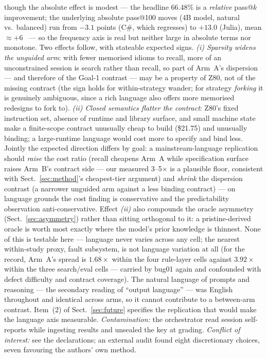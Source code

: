 \documentclass[runningheads]{llncs}
\begin{document}
though the absolute effect is modest --- the headline 66.48\% is a
\emph{relative} pass@$k$ improvement; the underlying absolute pass@100
moves (4B model, natural vs.\ balanced) run from $-3.1$ points (C\#, which
regresses) to $+13.0$ (Julia), mean $\approx{+}6$~\cite{orlanski2023} ---
so the frequency axis is real but neither large in absolute terms nor
monotone. Two effects follow, with stateable expected signs. \emph{(i) Sparsity widens the unguided arm}: with
fewer memorised idioms to recall, more of an unconstrained session is search
rather than recall, so part of Arm~A's dispersion --- and therefore of the
Goal-1 contrast --- may be a property of Z80, not of the missing contract
(the sign holds for within-strategy wander; for strategy \emph{forking} it
is genuinely ambiguous, since a rich language also offers more memorised
redesigns to fork to). \emph{(ii) Closed semantics flatter the contract}:
Z80's fixed instruction set, absence of runtime and library surface, and
small machine state make a finite-scope contract unusually cheap to build
(\$21.75) and unusually binding; a large-runtime language would cost more to
specify and bind less. Jointly the expected direction differs by goal: a
mainstream-language replication should \emph{raise} the cost ratio (recall
cheapens Arm~A while specification surface raises Arm~B's contract side ---
our measured 3--5$\times$ is a plausible floor, consistent with
Sect.~\ref{sec:method}'s cheapest-tier argument) and \emph{shrink} the
dispersion contrast (a narrower unguided arm against a less binding
contract) --- on language grounds the cost finding is conservative and the
predictability observation anti-conservative. Effect \emph{(ii)} also
compounds the oracle asymmetry (Sect.~\ref{sec:asymmetry}) rather than
sitting orthogonal to it: a pristine-derived oracle is worth most exactly
where the model's prior knowledge is thinnest. None of this is testable
here --- language never varies across any cell; the nearest within-study
proxy, fault subsystem, is not language variation at all (for the record,
Arm~A's spread is $1.68\times$ within the four rule-layer cells against
$3.92\times$ within the three search/eval cells --- carried by bug01 again
and confounded with defect difficulty and contract coverage). The natural
language of prompts and reasoning --- the secondary reading of ``output
language'' --- was English throughout and identical across arms, so it
cannot contribute to a between-arm contrast. Item~(2) of
Sect.~\ref{sec:future} specifies the replication that would make the
language axis measurable.
\emph{Contamination:} the orchestrator read session self-reports while
ingesting results and unsealed the key at grading.
\emph{Conflict of interest:} see the declarations; an external audit found
eight discretionary choices, seven favouring the authors' own method.
\end{document}
